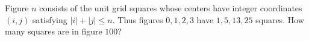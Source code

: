 Figure $n$ consists of the unit grid squares whose centers have integer coordinates $(i,j)$ satisfying $|i|+|j|\le n$. Thus figures $0,1,2,3$ have $1,5,13,25$ squares. How many squares are in figure $100$?
